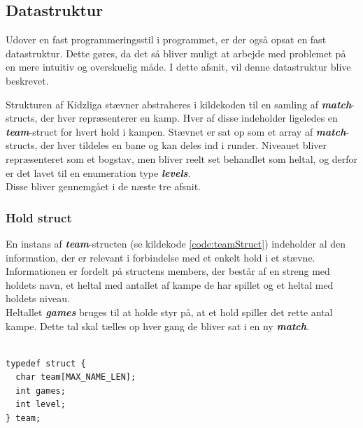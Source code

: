 \clearpage

\subsection{Datastruktur}
Udover en fast programmeringsstil i programmet, er der også opsat en fast datastruktur. Dette gøres, da det så bliver muligt at arbejde med problemet på en mere intuitiv og overskuelig måde. I dette afsnit, vil denne datastruktur blive beskrevet.
\par
Strukturen af Kidzliga stævner abstraheres i kildekoden til en samling af \textbf{\textit{match}}-structs, der hver repræsenterer en kamp. Hver af disse indeholder ligeledes en \textbf{\textit{team}}-struct for hvert hold i kampen. Stævnet er sat op som et array af \textbf{\textit{match}}-structs, der hver tildeles en bane og kan deles ind i runder. Niveauet bliver repræsenteret som et bogstav, men bliver reelt set behandlet som heltal, og derfor er det lavet til en enumeration type \textbf{\textit{levels}}.\\
Disse bliver gennemgået i de næste tre afsnit.


\subsubsection{Hold struct}
En instans af \textbf{\textit{team}}-structen (se kildekode \ref{code:teamStruct}) indeholder al den information, der er relevant i forbindelse med et enkelt hold i et stævne. \\
Informationen er fordelt på structens members, der består af en streng med holdets navn, et heltal med antallet af kampe de har spillet og et heltal med holdets niveau.\\
Heltallet \textbf{\textit{games}} bruges til at holde styr på, at et hold spiller det rette antal kampe. Dette tal skal tælles op hver gang de bliver sat i en ny \textbf{\textit{match}}.

\begin{listing}[H]
\begin{verbatim}

typedef struct {
  char team[MAX_NAME_LEN];
  int games;
  int level;
} team;

\end{verbatim}
\label{code:teamStruct}
\end{listing}

